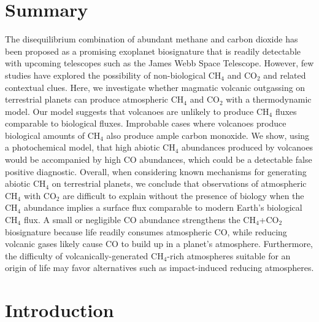 
\section*{\centering Summary}

The disequilibrium combination of abundant methane and carbon dioxide has been proposed as a promising exoplanet biosignature that is readily detectable with upcoming telescopes such as the James Webb Space Telescope. However, few studies have explored the possibility of non-biological CH$_4$ and CO$_2$ and related contextual clues. Here, we investigate whether magmatic volcanic outgassing on terrestrial planets can produce atmospheric CH$_4$ and CO$_2$ with a thermodynamic model. Our model suggests that volcanoes are unlikely to produce CH$_4$ fluxes comparable to biological fluxes. Improbable cases where volcanoes produce biological amounts of CH$_4$ also produce ample carbon monoxide. We show, using a photochemical model, that high abiotic CH$_4$ abundances produced by volcanoes would be accompanied by high CO abundances, which could be a detectable false positive diagnostic. Overall, when considering known mechanisms for generating abiotic CH$_4$ on terrestrial planets, we conclude that observations of atmospheric CH$_4$ with CO$_2$ are difficult to explain without the presence of biology when the CH$_4$ abundance implies a surface flux comparable to modern Earth's biological CH$_4$ flux. A small or negligible CO abundance strengthens the CH$_4$+CO$_2$ biosignature because life readily consumes atmospheric CO, while reducing volcanic gases likely cause CO to build up in a planet's atmosphere. Furthermore, the difficulty of volcanically-generated CH$_4$-rich atmospheres suitable for an origin of life may favor alternatives such as impact-induced reducing atmospheres.

\section{Introduction} \label{sec:intro}

